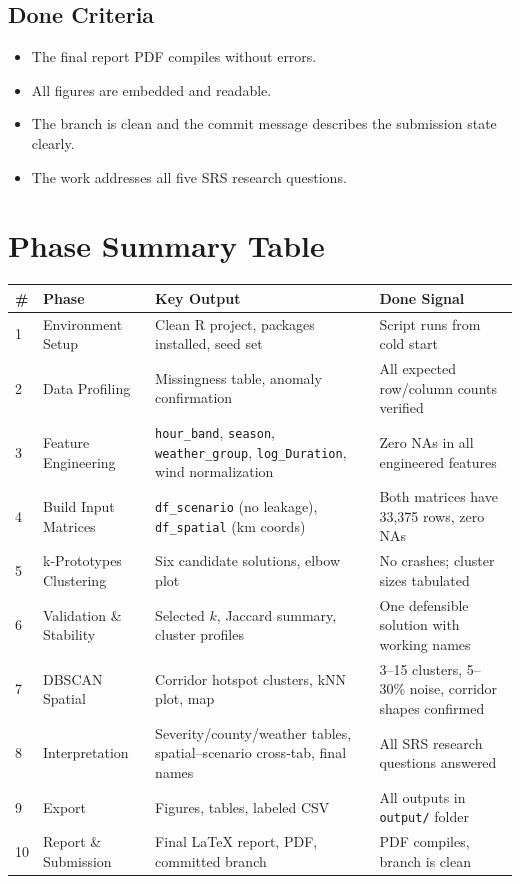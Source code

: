 \documentclass[11pt]{article}
\begin{document}
\subsection{Done Criteria}

\begin{itemize}
  \item The final report PDF compiles without errors.
  \item All figures are embedded and readable.
  \item The branch is clean and the commit message describes the submission state clearly.
  \item The work addresses all five SRS research questions.
\end{itemize}

\newpage
\section{Phase Summary Table}

\begin{longtable}{|p{0.5cm}|p{3cm}|p{6.5cm}|p{4.5cm}|}
\hline
\textbf{\#} & \textbf{Phase} & \textbf{Key Output} & \textbf{Done Signal} \\
\hline
1 & Environment Setup & Clean R project, packages installed, seed set & Script runs from cold start \\
\hline
2 & Data Profiling & Missingness table, anomaly confirmation & All expected row/column counts verified \\
\hline
3 & Feature Engineering & \texttt{hour\_band}, \texttt{season}, \texttt{weather\_group}, \texttt{log\_Duration}, wind normalization & Zero NAs in all engineered features \\
\hline
4 & Build Input Matrices & \texttt{df\_scenario} (no leakage), \texttt{df\_spatial} (km coords) & Both matrices have 33,375 rows, zero NAs \\
\hline
5 & k-Prototypes Clustering & Six candidate solutions, elbow plot & No crashes; cluster sizes tabulated \\
\hline
6 & Validation \& Stability & Selected $k$, Jaccard summary, cluster profiles & One defensible solution with working names \\
\hline
7 & DBSCAN Spatial & Corridor hotspot clusters, kNN plot, map & 3--15 clusters, 5--30\% noise, corridor shapes confirmed \\
\hline
8 & Interpretation & Severity/county/weather tables, spatial--scenario cross-tab, final names & All SRS research questions answered \\
\hline
9 & Export & Figures, tables, labeled CSV & All outputs in \texttt{output/} folder \\
\hline
10 & Report \& Submission & Final LaTeX report, PDF, committed branch & PDF compiles, branch is clean \\
\hline
\end{longtable}
\end{document}
